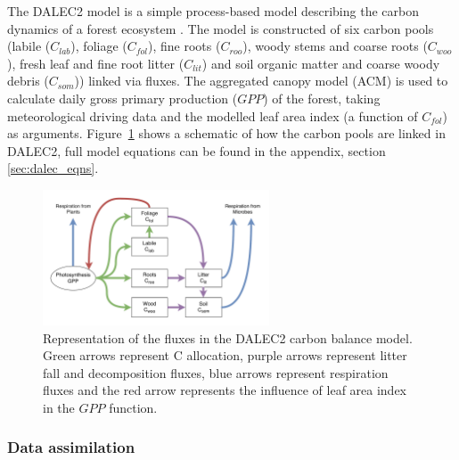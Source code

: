 \documentclass[draft,linenumbers]{agujournal}
\begin{document}
The DALEC2 model is a simple process-based model describing the carbon dynamics of a forest ecosystem \citep{Bloom2015}. The model is constructed of six carbon pools (labile ($C_{lab}$), foliage ($C_{fol}$), fine roots ($C_{roo}$), woody stems and coarse roots ($C_{woo}$), fresh leaf and fine root litter ($C_{lit}$) and soil organic matter and coarse woody debris ($C_{som}$)) linked via fluxes. The aggregated canopy model (ACM) \citep{williams1997predicting} is used to calculate daily gross primary production ($GPP$) of the forest, taking meteorological driving data and the modelled leaf area index (a function of $C_{fol}$) as arguments. Figure~\ref{fig:DALEC_mod} shows a schematic of how the carbon pools are linked in DALEC2, full model equations can be found in the appendix, section \ref{sec:dalec_eqns}.   

\begin{figure}[ht]
    \centering
    \includegraphics[width=0.6\textwidth]{dalec2diag.pdf}
    \caption{Representation of the fluxes in the DALEC2 carbon balance model. Green arrows represent C allocation, purple arrows represent litter fall and decomposition fluxes, blue arrows represent respiration fluxes and the red arrow represents the influence of leaf area index in the $GPP$ function.} \label{fig:DALEC_mod}
\end{figure}

\subsubsection{Data assimilation} \label{sec:da}
\end{document}
